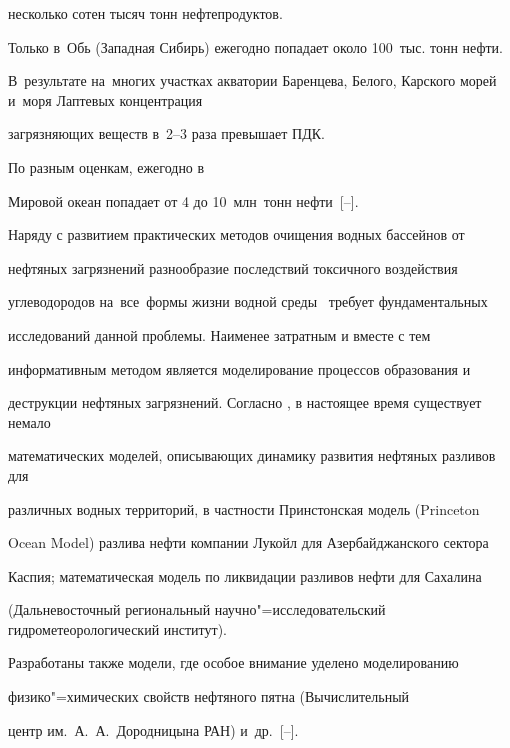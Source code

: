несколько сотен тысяч тонн нефтепродуктов. 

Только в~Обь (Западная Сибирь) ежегодно попадает около 100~тыс. тонн нефти. 

В~результате на~многих участках акватории Баренцева, Белого, Карского морей и~моря Лаптевых концентрация

загрязняющих веществ в~2--3 раза превышает ПДК. 

По разным оценкам, ежегодно в

Мировой океан попадает от 4 до 10~млн~тонн нефти~[--].



Наряду с развитием практических методов очищения водных бассейнов от

нефтяных загрязнений разнообразие последствий токсичного воздействия

углеводородов на~все~формы жизни водной среды~\cite{afa:bib5} требует фундаментальных

исследований данной проблемы. Наименее затратным и вместе с тем

информативным методом является моделирование процессов образования и

деструкции нефтяных загрязнений. Согласно \cite{afa:add:2}, в настоящее время существует немало

математических моделей, описывающих динамику развития нефтяных разливов для

различных водных территорий, в частности Принстонская модель (Princeton

Ocean Model) разлива нефти компании Лукойл для Азербайд\-жанского сектора

Каспия; математическая модель по ликвидации разливов нефти для Сахалина

(Дальневосточный региональный научно"=исследовательский гидрометеорологический институт).

Разработаны также модели, где особое внимание уделено моделированию

физико"=химических свойств нефтяного пятна (Вычислительный

центр им.~А.~А.~Дородницына РАН) \mbox{и~др.~[--].}



\smallskip




